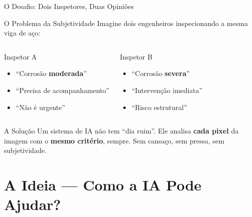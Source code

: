 \documentclass[aspectratio=169, 12pt]{beamer}
\begin{document}
\begin{frame}{O Desafio: Dois Inspetores, Duas Opiniões}
    \begin{block}{O Problema da Subjetividade}
        Imagine dois engenheiros inspecionando a mesma viga de aço:
    \end{block}

    \vspace{0.3cm}

    \begin{columns}[T]
        \begin{exampleblock}{Inspetor A}
            \begin{itemize}
                \item ``Corrosão \textbf{moderada}''
                \item ``Precisa de acompanhamento''
                \item ``Não é urgente''
            \end{itemize}
        \end{exampleblock}

        \begin{alertblock}{Inspetor B}
            \begin{itemize}
                \item ``Corrosão \textbf{severa}''
                \item ``Intervenção imediata''
                \item ``Risco estrutural''
            \end{itemize}
        \end{alertblock}
    \end{columns}

    \vspace{0.5cm}

    \begin{block}{A Solução}
        Um sistema de IA não tem ``dia ruim''. Ele analisa \textbf{cada pixel} da imagem com o \textbf{mesmo critério}, sempre. Sem cansaço, sem pressa, sem subjetividade.
    \end{block}
\end{frame}

\section{A Ideia --- Como a IA Pode Ajudar?}
\end{document}
